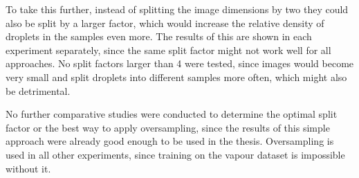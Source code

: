 To take this further, instead of splitting the image dimensions by two they could also be split by a larger factor, which would increase the relative density of droplets in the samples even more.
The results of this are shown in each experiment separately, since the same split factor might not work well for all approaches.
No split factors larger than 4 were tested, since images would become very small and split droplets into different samples more often, which might also be detrimental. 

No further comparative studies were conducted to determine the optimal split factor or the best way to apply oversampling, since the results of this simple approach were already good enough to be used in the thesis.
Oversampling is used in all other experiments, since training on the vapour dataset is impossible without it.

